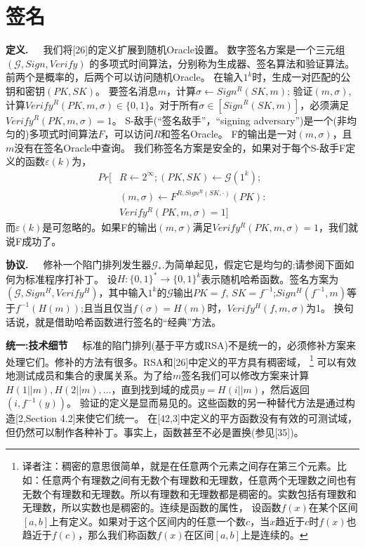 \documentclass[]{article}
\begin{document}
    \section{签名}
    \textbf{定义.}\ \ \ 
    我们将[26]的定义扩展到随机Oracle设置。
    数字签名方案是一个三元组$(\mathcal{G},Sign,Verify)$ 的多项式时间算法，分别称为生成器、签名算法和验证算法。前两个是概率的，后两个可以访问随机Oracle。
    在输入$1^k$时，生成一对匹配的公钥和密钥$(PK,SK)$。
    要签名消息$m$，计算$\sigma \leftarrow Sign^R(SK,m)$;
    验证$(m,\sigma)$,计算$Verify^R(PK,m,\sigma)\in \{0,1\}$。对于所有$\sigma \in [Sign^R(SK,m)]$，必须满足$Verify^R(PK,m,\sigma) = 1$。
    S-敌手(“签名敌手”，“signing adversary”)是一个(非均匀的)多项式时间算法$F$，可以访问$R$和签名Oracle。
    F的输出是一对$(m,\sigma)$，且$m$没有在签名Oracle中查询。
    我们称签名方案是安全的，如果对于每个S-敌手F定义的函数$\varepsilon(k)$为，
    \begin{align*}
    	Pr[&R\leftarrow 2^\infty;(PK,SK)\leftarrow \mathcal{G}(1^k);\\
    	   &(m,\sigma)\leftarrow F^{R,Sign^R(SK,\cdot)}(PK):\\
    	   &Verify^R(PK,m,\sigma)=1]
    \end{align*}
    而$\varepsilon(k)$是可忽略的。如果F的输出$(m,\sigma)$满足$Verify^R(PK,m,\sigma) = 1$，我们就说F成功了。
      
    
    
    \textbf{协议.}\ \ \ 
    修补一个陷门排列发生器$\mathcal{G}_*$.为简单起见，假定它是均匀的;请参阅下面如何为标准程序打补丁。
    设$H:\{0,1\}^*\rightarrow \{0,1\}^k$表示随机哈希函数。签名方案为$(\mathcal{G},Sign^H, Verify^H)$，其中输入$1^k$的$\mathcal{G}$输出$PK = f$, $SK =f^{-1}$;$Sign^H(f^{-1},m)$等于$f^{-1}(H(m))$;且当且仅当$f(\sigma)= H(m)$时，$Verify^H (f,m,\sigma)$为1。
    换句话说，就是借助哈希函数进行签名的“经典”方法。
    
    
    
    \textbf{统一:技术细节}\ \ \ 
    标准的陷门排列(基于平方或RSA)不是统一的，必须修补方案来处理它们。修补的方法有很多。RSA和[26]中定义的平方具有稠密域，
    \footnote{译者注：稠密的意思很简单，就是在任意两个元素之间存在第三个元素。比如：任意两个有理数之间有无数个有理数和无理数，任意两个无理数之间也有无数个有理数和无理数。所以有理数和无理数都是稠密的。实数包括有理数和无理数，所以实数也是稠密的。连续是函数的属性，
    设函数$f(x)$在某个区间$[a, b]$上有定义。如果对于这个区间内的任意一个数$c$，当$x$趋近于$c$时$f(x)$也趋近于$f(c)$，那么我们称函数$f(x)$在区间$[a, b]$上是连续的。}
    可以有效地测试成员和集合的隶属关系。为了给$m$签名我们可以修改方案来计算$H(1||m),H(2||m),\ldots$，直到找到域的成员$y=H(i||m)$，然后返回$(i,f^{-1}(y))$。
    验证的定义是显而易见的。这些函数的另一种替代方法是通过构造[2,Section 4.2]来使它们统一。
    在[42,3]中定义的平方函数没有有效的可测试域，但仍然可以制作各种补丁。事实上，函数甚至不必是置换(参见[35])。
    
\end{document}
